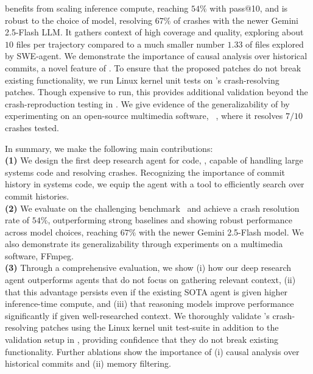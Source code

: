 \cresearcher{} benefits from scaling inference compute, reaching $54\%$ with pass@10, and is robust to the choice of model, resolving $67\%$ of crashes with the newer Gemini 2.5-Flash LLM.
It gathers context of high coverage and quality, exploring about $10$ files per trajectory compared to a much smaller number $1.33$ of files explored by SWE-agent. 
We demonstrate the importance of causal analysis over historical commits, a novel feature of \cresearcher{}.
To ensure that the proposed patches do not break existing functionality, we run Linux kernel unit tests on \cresearcher{}'s crash-resolving patches. Though expensive to run, this provides additional validation beyond the crash-reproduction testing in \kbenchsyz{}.
We give evidence of the generalizability of \cresearcher{} by experimenting on an open-source multimedia software, \ffmpeg{}~\citep{ffmpeg}, where it resolves $7/10$ crashes tested.

In summary, we make the following main contributions:\\
\textbf{(1)} We design the first deep research agent for code, \cresearcher{}, capable of handling large systems code and resolving crashes. Recognizing the importance of commit history in systems code, we equip the agent with a tool to efficiently search over commit histories.\\
\textbf{(2)} We evaluate \cresearcher{} on the challenging \kbenchsyz{} benchmark~\citep{kgym} and achieve a crash resolution rate of $54\%$, 
outperforming strong baselines and showing robust performance across model choices, reaching $67\%$ with the newer Gemini 2.5-Flash model.
We also demonstrate its generalizability through experiments on a multimedia software, FFmpeg.\\
\textbf{(3)} Through a comprehensive evaluation, we show (i) how our deep research agent outperforms agents that do not focus on gathering relevant context, (ii) that this advantage persists even if the existing SOTA agent is given higher inference-time compute, and (iii) that reasoning models improve performance significantly if given well-researched context. We thoroughly validate \cresearcher{}'s crash-resolving patches using the Linux kernel unit test-suite in addition to the validation setup in \kbenchsyz{}, providing confidence that they do not break existing functionality. Further ablations show the importance of (i) causal analysis over historical commits and (ii) memory filtering.
